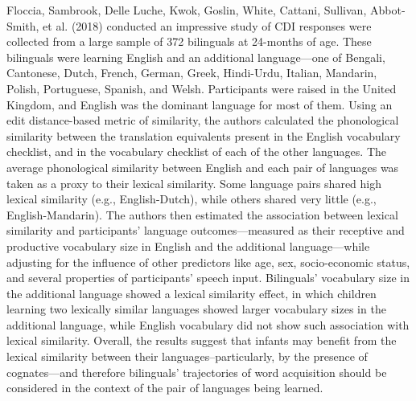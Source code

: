 \documentclass[
  12pt,
  b5paperpaper,
  twoside]{scrreprt}
\begin{document}
Floccia, Sambrook, Delle Luche, Kwok, Goslin, White, Cattani, Sullivan,
Abbot‐Smith, et al. (2018) conducted an impressive study of CDI
responses were collected from a large sample of 372 bilinguals at
24-months of age. These bilinguals were learning English and an
additional language---one of Bengali, Cantonese, Dutch, French, German,
Greek, Hindi-Urdu, Italian, Mandarin, Polish, Portuguese, Spanish, and
Welsh. Participants were raised in the United Kingdom, and English was
the dominant language for most of them. Using an edit distance-based
metric of similarity, the authors calculated the phonological similarity
between the translation equivalents present in the English vocabulary
checklist, and in the vocabulary checklist of each of the other
languages. The average phonological similarity between English and each
pair of languages was taken as a proxy to their lexical similarity. Some
language pairs shared high lexical similarity (e.g., English-Dutch),
while others shared very little (e.g., English-Mandarin). The authors
then estimated the association between lexical similarity and
participants' language outcomes---measured as their receptive and
productive vocabulary size in English and the additional
language---while adjusting for the influence of other predictors like
age, sex, socio-economic status, and several properties of participants'
speech input. Bilinguals' vocabulary size in the additional language
showed a lexical similarity effect, in which children learning two
lexically similar languages showed larger vocabulary sizes in the
additional language, while English vocabulary did not show such
association with lexical similarity. Overall, the results suggest that
infants may benefit from the lexical similarity between their
languages--particularly, by the presence of cognates---and therefore
bilinguals' trajectories of word acquisition should be considered in the
context of the pair of languages being learned.
\end{document}

